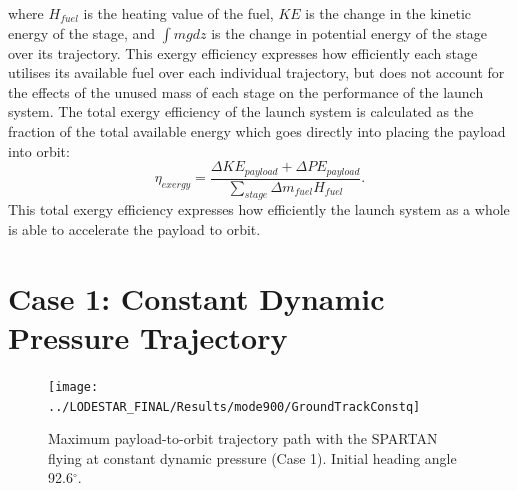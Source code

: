 where $H_{fuel}$ is the heating value of the fuel, $KE$ is the change in the kinetic energy of the stage, and $\int mg dz$ is the change in potential energy of the stage over its trajectory.
This exergy efficiency expresses how efficiently each stage utilises its available fuel over each individual trajectory, but does not account for the effects of the unused mass of each stage on the performance of the launch system. The total exergy efficiency of the launch system is calculated as the fraction of the total available energy which goes directly into placing the payload into orbit:
\begin{equation}
\eta_{exergy} = \frac{\Delta KE_{payload} + \Delta PE_{payload}}{\sum_{stage} \Delta m_{fuel}H_{fuel}}.
\end{equation}
This total exergy efficiency expresses how efficiently the launch system as a whole is able to accelerate the payload to orbit. 

\section{Case 1: Constant Dynamic Pressure Trajectory}
\begin{figure}[ht]
	\centering
	\texttt{[image: ../LODESTAR\_FINAL/Results/mode900/GroundTrackConstq]}
	\caption{Maximum payload-to-orbit trajectory path with the SPARTAN flying at constant dynamic pressure (Case 1). Initial heading angle 92.6$^\circ$.}
	\label{fig:GroundTrackConstq}
\end{figure}


